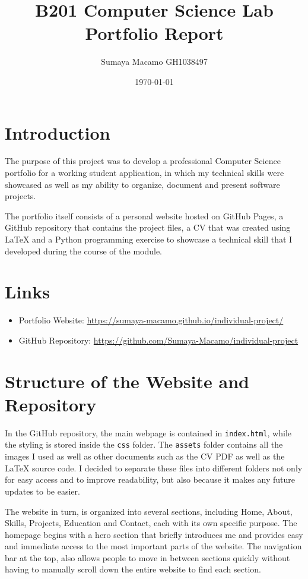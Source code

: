 \documentclass[12pt, a4paper]{article}
\title{B201 Computer Science Lab \\ \large Portfolio Report}
\author{Sumaya Macamo GH1038497}
\date{\today}
\begin{document}
\maketitle
\thispagestyle{empty}
\newpage

\tableofcontents
\newpage


\section{Introduction}
The purpose of this project was to develop a professional Computer Science portfolio for a working student application, in which my technical skills were showcased as well as my ability to organize, document and present software projects.

The portfolio itself consists of a personal website hosted on GitHub Pages, a GitHub repository that contains the project files, a CV that was created using LaTeX and a Python programming exercise to showcase a technical skill that I developed during the course of the module.

\section{Links}
\begin{itemize}
    \item Portfolio Website: \url{https://sumaya-macamo.github.io/individual-project/}
    \item GitHub Repository: \url{https://github.com/Sumaya-Macamo/individual-project}
\end{itemize}

\section{Structure of the Website and Repository}
In the GitHub repository, the main webpage is contained in \texttt{index.html}, while the styling is stored inside the \texttt{css} folder. The \texttt{assets} folder contains all the images I used as well as other documents such as the CV PDF as well as the LaTeX source code. I decided to separate these files into different folders not only for easy access and to improve readability, but also because it makes any future updates to be easier.

The website in turn, is organized into several sections, including Home, About, Skills, Projects, Education and Contact, each with its own specific purpose. The homepage begins with a hero section that briefly introduces me and provides easy and immediate access to the most important parts of the website. The navigation bar at the top, also allows people to move in between sections quickly without having to manually scroll down the entire website to find each section.
\end{document}
